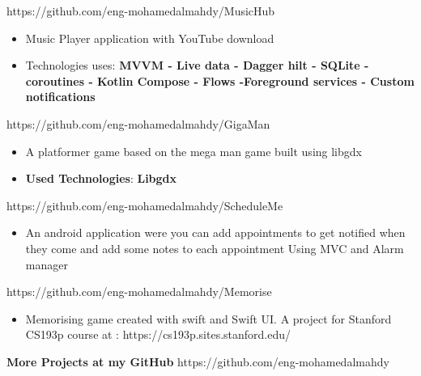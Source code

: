 \documentclass[10pt,a4paper,ragged2e,withhyper]{altacv}
\begin{document}
\begin{paracol}{1}
        {\cvrepo{|\faGithub\faAndroid}
        {https://github.com/eng-mohamedalmahdy/MusicHub}
        }{}{}
        \begin{itemize}
            \item \textbf{} Music Player application with YouTube download
            \item Technologies uses: \textbf{MVVM - Live data - Dagger hilt - SQLite  - coroutines - Kotlin Compose - Flows -\linebreak Foreground services - Custom notifications}
        \end{itemize}
        \divider
        {\cvrepo{|\faGithub\faGamepad}
        {https://github.com/eng-mohamedalmahdy/GigaMan}}{}{}
        \begin{itemize}
            \item \textbf{}A platformer game based on the mega man game built using libgdx
            \item \textbf{Used Technologies}: \textbf{Libgdx}
        \end{itemize}
        \divider
        {\cvrepo{|\faGithub\faAndroid}
        {https://github.com/eng-mohamedalmahdy/ScheduleMe}}{}{}
        \begin{itemize}
            \item \textbf{}An android application were you can add appointments to get notified when they come and add some notes to each appointment Using MVC and Alarm manager
        \end{itemize}
        \divider
        {\cvrepo{|\faGithub\faApple}
        {https://github.com/eng-mohamedalmahdy/Memorise}
        }{}{}
        \begin{itemize}
            \item \textbf{} Memorising game created with swift and Swift UI. \linebreak
            A project for Stanford CS193p course at : https://cs193p.sites.stanford.edu/
        \end{itemize}
        \divider

        \begin{center}
            \textbf{\Large More Projects at my GitHub}
            {\cvrepo{\faGithub}
            {https://github.com/eng-mohamedalmahdy}}{}{}
        \end{center}
        \divider
    \end{paracol}
\end{document}
